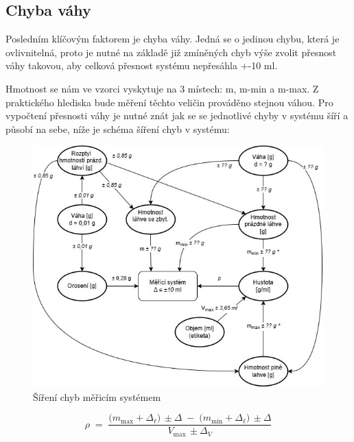 \subsection{Chyba váhy}
Posledním klíčovým faktorem je chyba váhy. Jedná se o jedinou chybu, která je ovlivnitelná, proto je nutné na základě již zmíněných chyb výše zvolit přesnost váhy takovou, aby celková přesnost systému nepřesáhla +-10 ml. 


Hmotnost se nám ve vzorci vyskytuje na 3 místech: m, m-min a m-max. Z praktického hlediska bude měření těchto veličin prováděno stejnou váhou. Pro vypočtení přesnosti váhy je nutné znát jak se se jednotlivé chyby v systému šíří a působí na sebe, níže je schéma šíření chyb v systému:

\begin{figure}[H]
    \begin{center}
        \includegraphics[scale=0.9]{obrazky/Propagace nejistot-Metoda1++.jpg}
    \end{center}
    \caption{Šíření chyb měřicím systémem}
\end{figure}

\[
\rho \;=\;
\frac{\bigl(m_{\max}+\Delta_{\ell}\bigr)\,\pm\Delta
      \;-\;\bigl(m_{\min}+\Delta_{\ell}\bigr)\,\pm\Delta}
     {V_{\max}\,\pm\Delta_V}
\]

